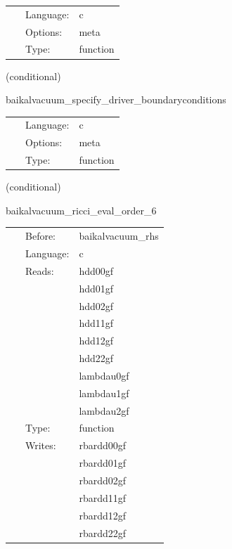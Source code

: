 \hspace{5mm}

 \begin{tabular*}{160mm}{cll} 
~ & Language:  & c \\ 
~ & Options:  & meta \\ 
~ & Type:  & function \\ 
\end{tabular*} 


\vspace{5mm}

   (conditional) 

\hspace{5mm} baikalvacuum\_specify\_driver\_boundaryconditions 

\hspace{5mm}{\it register boundary conditions in presync bin driver\_boundaryselect. } 


\hspace{5mm}

 \begin{tabular*}{160mm}{cll} 
~ & Language:  & c \\ 
~ & Options:  & meta \\ 
~ & Type:  & function \\ 
\end{tabular*} 


\vspace{5mm}

   (conditional) 

\hspace{5mm} baikalvacuum\_ricci\_eval\_order\_6 

\hspace{5mm}{\it compute ricci tensor, needed for bssn rhss, at finite-differencing order 6 } 


\hspace{5mm}

 \begin{tabular*}{160mm}{cll} 
~ & Before:  & baikalvacuum\_rhs \\ 
~ & Language:  & c \\ 
~ & Reads:  & hdd00gf \\ 
~& ~ &hdd01gf\\ 
~& ~ &hdd02gf\\ 
~& ~ &hdd11gf\\ 
~& ~ &hdd12gf\\ 
~& ~ &hdd22gf\\ 
~& ~ &lambdau0gf\\ 
~& ~ &lambdau1gf\\ 
~& ~ &lambdau2gf\\ 
~ & Type:  & function \\ 
~ & Writes:  & rbardd00gf \\ 
~& ~ &rbardd01gf\\ 
~& ~ &rbardd02gf\\ 
~& ~ &rbardd11gf\\ 
~& ~ &rbardd12gf\\ 
~& ~ &rbardd22gf\\ 
\end{tabular*} 


